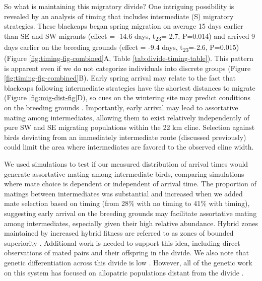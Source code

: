 \documentclass[a4paper, twoside]{templates/ociamthesis}
\begin{document}
So what is maintaining this migratory divide? One intriguing possibility is revealed by an analysis of timing that includes intermediate (S) migratory strategies. These blackcaps began spring migration on average 15 days earlier than SE and SW migrants (effect = -14.6 days, t\textsubscript{23}=-2.7, P=0.014) and arrived 9 days earlier on the breeding grounds (effect = -9.4 days, t\textsubscript{23}=-2.6, P=0.015) (Figure \ref{fig:timing-fig-combined}A, Table \ref{tab:divide-timing-table}). This pattern is apparent even if we do not categorize individuals into discrete groups (Figure \ref{fig:timing-fig-combined}B). Early spring arrival may relate to the fact that blackcaps following intermediate strategies have the shortest distances to migrate (Figure \ref{fig:mig-dist-fig}D), so cues on the wintering site may predict conditions on the breeding grounds \autocite{bothAvianPopulationConsequences2009,butlerDisproportionateEffectGlobal2003}. Importantly, early arrival may lead to assortative mating among intermediates, allowing them to exist relatively independently of pure SW and SE migrating populations within the 22 km cline. Selection against birds deviating from an immediately intermediate route (discussed previously) could limit the area where intermediates are favored to the observed cline width.

We used simulations to test if our measured distribution of arrival times would generate assortative mating among intermediate birds, comparing simulations where mate choice is dependent or independent of arrival time. The proportion of matings between intermediates was substantial and increased when we added mate selection based on timing (from 28\% with no timing to 41\% with timing), suggesting early arrival on the breeding grounds may facilitate assortative mating among intermediates, especially given their high relative abundance. Hybrid zones maintained by increased hybrid fitness are referred to as zones of bounded superiority \autocite{mooreEvaluationNarrowHybrid1977}. Additional work is needed to support this idea, including direct observations of mated pairs and their offspring in the divide. We also note that genetic differentiation across this divide is low \autocite{delmoreEvolutionaryHistoryGenomics}. However, all of the genetic work on this system has focused on allopatric populations distant from the divide \autocite{muellerIdentificationGeneAssociated2011,perez-trisHistoricalDiversificationMigration2004,rolshausenContemporaryEvolutionReproductive2009,rolshausenIndividualDifferencesMigratory2013}.
\end{document}
